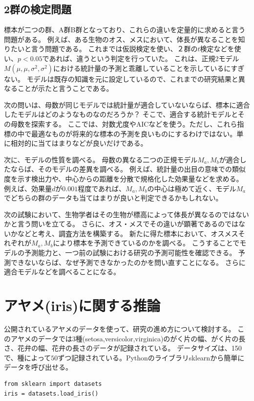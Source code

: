 \subsection{2群の検定問題}
標本が二つの群、A群B群となっており、これらの違いを定量的に求めると言う問題がある。
例えば、ある生物のオス、メスにおいて、体長が異なることを知りたいと言う問題である。
これまでは仮説検定を使い、２群の$t$検定などを使い、$p<0.05$であれば、違うという判定を行っていた。
これは、正規2モデル$M(\mu,\mu,\sigma^2,\sigma^2)$における統計量の予測と乖離していることを示しているにすぎない。
モデルは既存の知識を元に設定しているので、これまでの研究結果と異なることが示たと言うことである。

次の問いは、母数が同じモデルでは統計量が適合していないならば、標本に適合したモデルはどのようなものなのだろうか？
そこで、適合する統計モデルとその母数を探索する。
ここでは、対数尤度やAICなどを使う。ただし、これら指標の中で最適なものが将来的な標本の予測を良いものにするわけではない。単に相対的に当てはまりなどが良いだけである。

次に、モデルの性質を調べる。
母数の異なる二つの正規モデル$M_a,M_b$が適合したならば、そのモデルの差異を調べる。
例えば、統計量の出目の意味での類似度を示す検出力や、中心からの距離を分散で規格化した効果量などを求める。
例えば、効果量$d$が$0.001$程度であれば、$M_a,M_b$の中心は極めて近く、モデル$M_a$でどちらの群のデータも当てはまりが良いと判定できるかもしれない。

次の試験において、生物学者はその生物が標高によって体長が異なるのではないかと言う問いを立てる。
さらに、オス・メスでその違いが顕著であるのではないかなどと考え、調査方法を構築する。
新たに得た標本において、オスメスそれぞれが$M_a,M_b$により標本を予測できているのかを調べる。
こうすることでモデルの予測能力と、一つ前の試験における研究の予測可能性を確認できる。
予測できないならば、なぜ予測できなかったのかを問い直すことになる。
さらに適合モデルなどを調べることになる。


\section{アヤメ(iris)に関する推論}
公開されているアヤメのデータを使って、研究の進め方について検討する。
このアヤメのデータでは$3$種(setosa,versicolor,virginica)のがく片の幅、がく片の長さ、花弁の幅、花弁の長さのデータが記録されている。
データサイズは、150で、種によって$50$ずつ記録されている。Pythonのライブラリsklearnから簡単にデータを呼び出せる。
\begin{lstlisting}
from sklearn import datasets
iris = datasets.load_iris()
\end{lstlisting}

